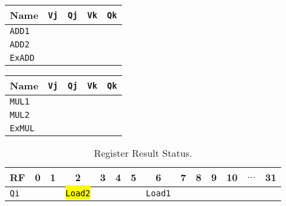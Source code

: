 \begin{enumerate}
    \begin{minipage}[t]{0.45\textwidth}
            \centering
            \begin{tabular}{@{} l | c c c c @{}}
                \toprule
                Name            & \texttt{Vj}   & \texttt{Qj}   & \texttt{Vk}           & \texttt{Qk}   \\
                \midrule
                \texttt{ADD1}   &               &               &                       &               \\ [.3em]
                \texttt{ADD2}   &               &               &                       &               \\
                \cmidrule{1-5}
                \texttt{ExADD}  &               &               &                       &               \\
                \bottomrule
            \end{tabular}
    \end{minipage}
    \hfill
    \begin{minipage}[t]{0.45\textwidth}
            \centering
            \begin{tabular}{@{} l | c c c c @{}}
                \toprule
                Name            & \texttt{Vj}   & \texttt{Qj}   & \texttt{Vk}           & \texttt{Qk}   \\
                \midrule
                \texttt{MUL1}   &               &               &                       &               \\ [.3em]
                \texttt{MUL2}   &               &               &                       &               \\
                \cmidrule{1-5}
                \texttt{ExMUL}  &               &               &                       &               \\
                \bottomrule
            \end{tabular}
    \end{minipage}
    \begin{table}[!htp]
        \centering
        \begin{tabular}{@{} l | c c c c c c c c c c c c c @{}}
            \toprule
            RF              & 0             & 1             & 2                     & 3             & 4             & 5             & 6                     & 7             & 8             & 9             & 10            & $\dots$           & 31            \\
            \midrule
            \texttt{Qi}     &               &               & \hl{\texttt{Load2}}   &               &               &               & \texttt{Load1}        &               &               &               &               &                   &               \\
            \bottomrule
        \end{tabular}
        \caption*{Register Result Status.}
    \end{table}


\end{enumerate}
